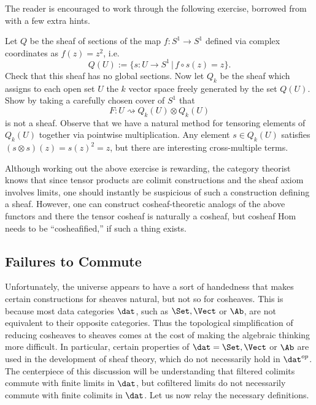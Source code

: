 The reader is encouraged to work through the following exercise, borrowed from~\cite{achar-lsu} with a few extra hints.

\begin{exr}
Let $Q$ be the sheaf of sections of the map $f:S^1\to S^1$ defined via complex coordinates as $f(z)=z^2$, i.e.
\[
Q(U):=\{s:U\to S^1\,|\, f\circ s(z)=z\}.
\]
Check that this sheaf has no global sections. Now let $Q_{k}$ be the sheaf which assigns to each open set $U$ the $k$ vector space freely generated by the set $Q(U)$. Show by taking a carefully chosen cover of $S^1$ that
\[
F:U\rightsquigarrow Q_{k}(U)\otimes Q_{k}(U)
\]
is not a sheaf. Observe that we have a natural method for tensoring elements of $Q_{k}(U)$ together via pointwise multiplication. Any element $s\in Q_{k}(U)$ satisfies $(s\otimes s)(z)=s(z)^2=z$, but there are interesting cross-multiple terms.
\end{exr}

Although working out the above exercise is rewarding, the category theorist knows that since tensor products are colimit constructions and the sheaf axiom involves limits, one should instantly be suspicious of such a construction defining a sheaf. However, one can construct cosheaf-theoretic analogs of the above functors and there the tensor cosheaf is naturally a cosheaf, but cosheaf Hom needs to be ``cosheafified,'' if such a thing exists.

\subsection{Failures to Commute}\label{subsec:failure_to_commute}

Unfortunately, the universe appears to have a sort of handedness that makes certain constructions for sheaves natural, but not so for cosheaves. This is because most data categories $\dat$, such as $\Set,\Vect$ or $\Ab$, are not equivalent to their opposite categories. Thus the topological simplification of reducing cosheaves to sheaves comes at the cost of making the algebraic thinking more difficult. In particular, certain properties of $\dat=\Set,\Vect$ or $\Ab$ are used in the development of sheaf theory, which do not necessarily hold in $\dat^{op}$. The centerpiece of this discussion will be understanding that filtered colimits commute with finite limits in $\dat$, but cofiltered limits do not necessarily commute with finite colimits in $\dat$. Let us now relay the necessary definitions.

